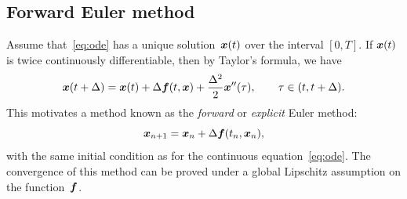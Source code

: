 \subsection{Forward Euler method}
\label{sub:explicit_euler}
Assume that~\eqref{eq:ode} has a unique solution~$\mathbf{\boldsymbol{x}}(t)$ over the interval $[0, T]$.
If $\mathbf{\boldsymbol{x}}(t)$ is twice continuously differentiable,
then by Taylor's formula,
we have
\begin{equation}
    \label{eq:taylor_forward}
    \mathbf{\boldsymbol{x}}(t + \Delta) = \mathbf{\boldsymbol{x}}(t) + \Delta \mathbf{\boldsymbol{f}}(t, \mathbf{\boldsymbol{x}}) + \frac{\Delta^2}{2} \mathbf{\boldsymbol{x}}''(\tau),
    \qquad \tau \in (t, t+\Delta).
\end{equation}
This motivates a method known as the \emph{forward} or \emph{explicit} Euler method:
\[
    \mathbf{\boldsymbol{x}}_{n+1} = \mathbf{\boldsymbol{x}}_{n} + \Delta \mathbf{\boldsymbol{f}}(t_n, \mathbf{\boldsymbol{x}}_n),
\]
with the same initial condition as for the continuous equation~\eqref{eq:ode}.
The convergence of this method can be proved under a global Lipschitz assumption on the function~$\mathbf{\boldsymbol{f}}$.

